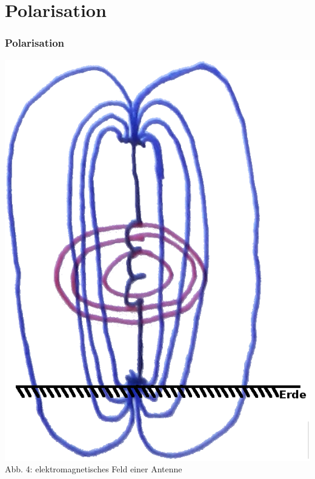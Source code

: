 \section*{Polarisation}
\begin{frame}
\frametitle{Polarisation}
\begin{center}
	\begin{minipage}{0.4\textwidth}
		\includegraphics[scale=0.6]{e08/emagfeld2.png}\\
		Abb. 4: elektromagnetisches Feld einer Antenne
	\end{minipage}
	\begin{minipage}{0.4\textwidth}

\end{minipage}
\end{center}
\end{frame}
